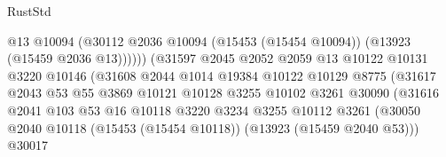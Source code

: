 \begin{lexlean}{RustStd}
\begin{coremodule}
                                            @13
                                            @10094
                                            (@30112
                                              @2036
                                              @10094
                                              (@15453 (@15454 @10094))
                                              (@13923 (@15459 @2036 @13))))))
                                      (@31597
                                        @2045
                                        @2052
                                        @2059
                                        @13
                                        @10122
                                        @10131
                                        @3220
                                        @10146
                                        (@31608
                                          @2044
                                          @1014
                                          @19384
                                          @10122
                                          @10129
                                          @8775
                                          (@31617
                                            @2043
                                            @53
                                            @55
                                            @3869
                                            @10121
                                            @10128
                                            @3255
                                            @10102
                                            @3261
                                            @30090
                                            (@31616
                                              @2041
                                              @103
                                              @53
                                              @16
                                              @10118
                                              @3220
                                              @3234
                                              @3255
                                              @10112
                                              @3261
                                              (@30050
                                                @2040
                                                @10118
                                                (@15453 (@15454 @10118))
                                                (@13923 (@15459 @2040 @53)))
                                              @30017

\end{coremodule}
\end{lexlean}
